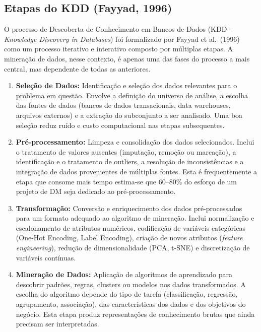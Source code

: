 \documentclass[12pt,a4paper]{article}
\begin{document}
\subsection{Etapas do KDD (Fayyad, 1996)}

O processo de Descoberta de Conhecimento em Bancos de Dados (KDD - \textit{Knowledge Discovery in Databases}) foi formalizado por Fayyad et al.\ (1996) como um processo iterativo e interativo composto por múltiplas etapas. A mineração de dados, nesse contexto, é apenas uma das fases do processo a mais central, mas dependente de todas as anteriores.

\begin{enumerate}[leftmargin=*, label=\textbf{Etapa \arabic*:}]
  \item \textbf{Seleção de Dados:} Identificação e seleção dos dados relevantes para o problema em questão. Envolve a definição do universo de análise, a escolha das fontes de dados (bancos de dados transacionais, data warehouses, arquivos externos) e a extração do subconjunto a ser analisado. Uma boa seleção reduz ruído e custo computacional nas etapas subsequentes.

  \item \textbf{Pré-processamento:} Limpeza e consolidação dos dados selecionados. Inclui o tratamento de valores ausentes (imputação, remoção ou marcação), a identificação e o tratamento de outliers, a resolução de inconsistências e a integração de dados provenientes de múltiplas fontes. Esta é frequentemente a etapa que consome mais tempo estima-se que 60--80\% do esforço de um projeto de DM seja dedicado ao pré-processamento.

  \item \textbf{Transformação:} Conversão e enriquecimento dos dados pré-processados para um formato adequado ao algoritmo de mineração. Inclui normalização e escalonamento de atributos numéricos, codificação de variáveis categóricas (One-Hot Encoding, Label Encoding), criação de novos atributos (\textit{feature engineering}), redução de dimensionalidade (PCA, t-SNE) e discretização de variáveis contínuas.

  \item \textbf{Mineração de Dados:} Aplicação de algoritmos de aprendizado para descobrir padrões, regras, clusters ou modelos nos dados transformados. A escolha do algoritmo depende do tipo de tarefa (classificação, regressão, agrupamento, associação), das características dos dados e dos objetivos do negócio. Esta etapa produz representações de conhecimento brutas que ainda precisam ser interpretadas.


\end{enumerate}
\end{document}
